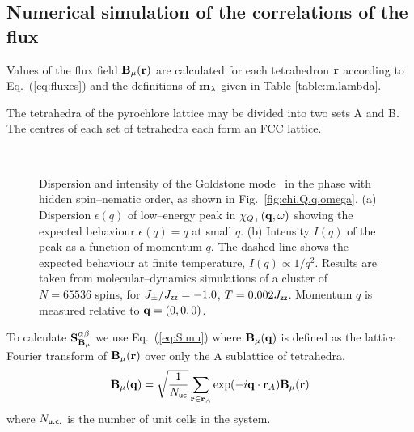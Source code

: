 \documentclass[apsrev4-1,prx,superscriptaddress,floatfix,twocolumn,longbibliography]{revtex4-1}
\begin{document}
\begin{appendix}
\section{Numerical simulation of the correlations of the flux}

\label{app:fluxsim}

Values of the flux field ${\bf B}_{\mu}(\mathbf{r})$
are calculated for each tetrahedron ${\bf r}$
according to Eq.~(\ref{eq:fluxes})
and the definitions of ${\bf m}_{\lambda}$ given in Table
\ref{table:m.lambda}.


The tetrahedra of the pyrochlore lattice may be divided into
two sets A and B.
%
The centres of each set of tetrahedra each form an FCC lattice.


\begin{figure}[h!]
  \centering
  \\
  \caption{
    Dispersion and intensity of the Goldstone mode \
    in the phase with hidden spin--nematic order, as shown 
    in Fig.~\ref{fig:chi.Q.q.omega}.   
  (a) Dispersion $\epsilon (q)$ of low--energy peak in 
  $\chi_{Q_{\perp}}({\bf q}, \omega)$ showing the expected behaviour $\epsilon (q) =  q$ 
  at small $q$.
  (b) Intensity $I(q)$ of the peak as a function of 
  momentum $q$. 
  The dashed line shows the expected behaviour at finite temperature, 
  $I(q) \propto 1/q^2$.  
  Results are taken from molecular--dynamics simulations 
  of a cluster of $N=65536$ spins, 
  for $J_\pm/J_{\sf zz} = -1.0$, $T = 0.002 J_{\sf zz}$.
  Momentum $q$ is measured relative to ${\bf q}=(0,0,0)$.}
  \label{fig:Goldstone.mode}
\end{figure}


To calculate ${\bf S}_{{\bf B}_{\mu}}^{\alpha \beta}$ we use Eq.~(\ref{eq:S.mu})
where ${\bf B}_{\mu}(\mathbf{q})$ is defined as
the lattice Fourier transform of  ${\bf B}_{\mu}(\mathbf{r})$ over
only the A sublattice of tetrahedra.
\begin{eqnarray}
{\bf B}_{\mu}(\mathbf{q})=\sqrt{\frac{1}{N_{\sf uc}}}
\sum_{{\bf r} \in {\bf r}_A} \exp(-i \mathbf{q} \cdot {\mathbf{r}}_A)
{\bf B}_{\mu}(\mathbf{r})
\end{eqnarray}
where $N_{\sf u.c.}$ is the number of unit cells in the system.


\end{appendix}
\end{document}
